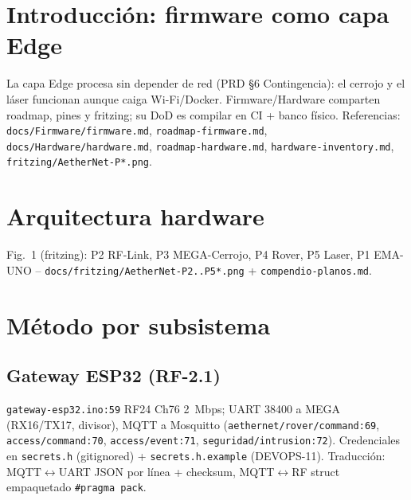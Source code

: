 \documentclass[conference]{IEEEtran}
\begin{document}
\section{Introducción: firmware como capa Edge}
La capa Edge procesa sin depender de red (PRD \S6 Contingencia): el cerrojo y el láser funcionan aunque caiga Wi-Fi/Docker. Firmware/Hardware comparten roadmap, pines y fritzing; su DoD es compilar en CI + banco físico. Referencias: \texttt{docs/Firmware/firmware.md}, \texttt{roadmap-firmware.md}, \texttt{docs/Hardware/hardware.md}, \texttt{roadmap-hardware.md}, \texttt{hardware-inventory.md}, \texttt{fritzing/AetherNet-P*.png}.

\section{Arquitectura hardware}
\begin{table}[t]
\centering
\caption{Mapa componente$\rightarrow$función$\rightarrow$pines (hardware.md \S Mapa)}
\label{tab:hw}
\footnotesize
\setlength{\tabcolsep}{3pt}
\end{table}

Fig.~1 (fritzing): P2 RF-Link, P3 MEGA-Cerrojo, P4 Rover, P5 Laser, P1 EMA-UNO -- \texttt{docs/fritzing/AetherNet-P2..P5*.png} + \texttt{compendio-planos.md}.

\section{Método por subsistema}
\subsection{Gateway ESP32 (RF-2.1)}
\texttt{gateway-esp32.ino:59} RF24 Ch76 2~Mbps; UART 38400 a MEGA (RX16/TX17, divisor), MQTT a Mosquitto (\texttt{aethernet/rover/command:69}, \texttt{access/command:70}, \texttt{access/event:71}, \texttt{seguridad/intrusion:72}). Credenciales en \texttt{secrets.h} (gitignored) + \texttt{secrets.h.example} (DEVOPS-11). Traducción: MQTT$\leftrightarrow$UART JSON por línea + checksum, MQTT$\leftrightarrow$RF struct empaquetado \texttt{\#pragma pack}.
\end{document}
